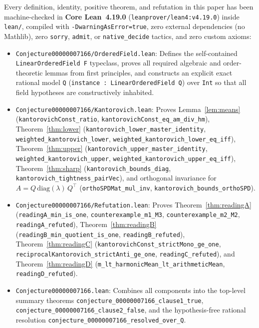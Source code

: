 \documentclass[11pt,a4paper]{article}
\theoremstyle{definition}
\newcommand{\diag}{\mathrm{diag}}
\begin{document}
Every definition, identity, positive theorem, and refutation in this paper has
been machine-checked in \textbf{Core Lean~4.19.0}
(\texttt{leanprover/lean4:v4.19.0}) inside \texttt{lean/}, compiled with
\texttt{-DwarningAsError=true}, zero external dependencies (no Mathlib), zero
\texttt{sorry}, \texttt{admit}, or \texttt{native\_decide} tactics, and zero
custom axioms:
{\raggedright
\begin{itemize}
  \item \texttt{Conjecture00000007166/OrderedField.lean}: Defines the
  self-contained \texttt{LinearOrderedField F} typeclass, proves all required
  algebraic and order-theoretic lemmas from first principles, and constructs an
  explicit exact rational model \texttt{Q} (\texttt{instance : LinearOrderedField Q})
  over \texttt{Int} so that all field hypotheses are constructively inhabited.
  \item \texttt{Conjecture00000007166/Kantorovich.lean}: Proves
  Lemma~\ref{lem:means} (\texttt{kantorovichConst\_ratio},
  \texttt{kantorovichConst\_eq\_am\_div\_hm}), Theorem~\ref{thm:lower}
  (\texttt{kantorovich\_lower\_master\_identity}, \texttt{weighted\_kantorovich\_lower},
  \texttt{weighted\_kantorovich\_lower\_eq\_iff}), Theorem~\ref{thm:upper}
  (\texttt{kantorovich\_upper\_master\_identity}, \texttt{weighted\_kantorovich\_upper},
  \texttt{weighted\_kantorovich\_upper\_eq\_iff}), Theorem~\ref{thm:sharp}
  (\texttt{kantorovich\_bounds\_diag}, \texttt{kantorovich\_tightness\_pairVec}),
  and orthogonal invariance for $A = Q\,\diag(\lambda)\,Q^\top$
  (\texttt{orthoSPDMat\_mul\_inv}, \texttt{kantorovich\_bounds\_orthoSPD}).
  \item \texttt{Conjecture00000007166/Refutation.lean}: Proves
  Theorem~\ref{thm:readingA} (\texttt{readingA\_min\_is\_one},
  \texttt{counterexample\_m1\_M3}, \texttt{counterexample\_m2\_M2},
  \texttt{readingA\_refuted}), Theorem~\ref{thm:readingB}
  (\texttt{readingB\_min\_quotient\_is\_one}, \texttt{readingB\_refuted}),
  Theorem~\ref{thm:readingC} (\texttt{kantorovichConst\_strictMono\_ge\_one},
  \texttt{reciprocalKantorovich\_strictAnti\_ge\_one}, \texttt{readingC\_refuted}),
  and Theorem~\ref{thm:readingD} (\texttt{m\_lt\_harmonicMean\_lt\_arithmeticMean},
  \texttt{readingD\_refuted}).
  \item \texttt{Conjecture00000007166.lean}: Combines all components into the
  top-level summary theorems \texttt{conjecture\_00000007166\_clause1\_true},
  \texttt{conjecture\_00000007166\_clause2\_false}, and the hypothesis-free
  rational resolution \texttt{conjecture\_00000007166\_resolved\_over\_Q}.
\end{itemize}
}
\end{document}
